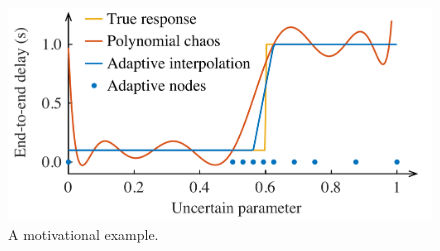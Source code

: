 \begin{figure}
  \centering
  \includegraphics[width=1.0\columnwidth]{include/assets/figures/motivation.pdf}
  \caption{
    A motivational example.
  }
\end{figure}
